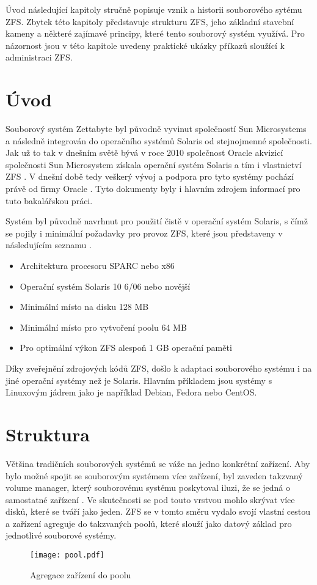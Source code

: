 Úvod následující kapitoly stručně popisuje vznik a historii souborového sytému ZFS. Zbytek této kapitoly představuje strukturu ZFS, jeho základní stavební kameny a některé zajímavé principy, které tento souborový systém využívá. Pro názornost jsou v této kapitole uvedeny praktické ukázky příkazů sloužící k administraci ZFS.

\section{Úvod}
    Souborový systém Zettabyte byl původně vyvinut společností Sun Microsystems a následně integrován do operačního systémů Solaris od stejnojmenné společnosti.
    Jak už to tak v dnešním světě bývá v roce 2010 společnost Oracle akvizicí společnosti Sun Microsystem získala operační systém Solaris a tím i vlastnictví ZFS \cite{suns}. V dnešní době tedy veškerý vývoj a podpora pro tyto systémy pochází právě od firmy Oracle \cite{guide}. Tyto dokumenty byly i hlavním zdrojem informací pro tuto bakalářskou práci.

    Systém byl původně navrhnut pro použití čistě v operační systém Solaris, s čímž se pojily i minimální požadavky pro provoz ZFS, které jsou představeny v následujícím seznamu \cite{requirements}.
    \begin{itemize}
      \item Architektura procesoru SPARC nebo x86
      \item Operační systém Solaris 10 6/06 nebo novější
      \item Minimální místo na disku 128 MB
      \item Minimální místo pro vytvoření poolu 64 MB
      \item Pro optimální výkon ZFS alespoň 1 GB operační paměti
    \end{itemize}

    Díky zveřejnění zdrojových kódů ZFS, došlo k adaptaci souborového systému i na jiné operační systémy než je Solaris. Hlavním příkladem jsou systémy s Linuxovým jádrem jako je například Debian, Fedora nebo CentOS.

\section{Struktura}
Většina tradičních souborových systémů se váže na jedno konkrétní zařízení. Aby bylo možné spojit se souborovým systémem více zařízení, byl zaveden takzvaný volume manager, který souborovému systému poskytoval iluzi, že se jedná o samostatné zařízení \cite{traditional}. Ve skutečnosti se pod touto vrstvou mohlo skrývat více disků, které se tváří jako jeden. ZFS se v tomto směru vydalo svojí vlastní cestou a zařízení agreguje do takzvaných poolů, které slouží jako datový základ pro jednotlivé souborové systémy.
\begin{figure}[!h]
    \caption{Agregace zařízení do poolu}
    \label{agregation}
    \centering
    \texttt{[image: pool.pdf]}
\end{figure}
